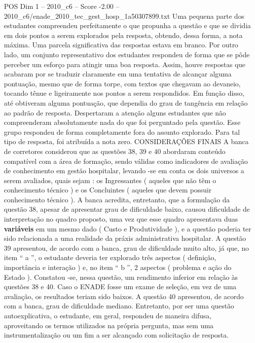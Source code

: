 \begin{textsample}{POS Dim 1 – 2010\_c6 – Score -2.00 – 2010\_c6/enade\_2010\_tec\_gest\_hosp\_1a50307899.txt}
Uma pequena parte dos estudantes compreendeu perfeitamente o que propunha a questão e que se dividia em dois pontos a serem explorados pela resposta, obtendo, dessa forma, a nota máxima.
Uma parcela significativa das respostas estava em branco.
Por outro lado, um conjunto representativo dos estudantes respondeu de forma que se pôde perceber um esforço para atingir uma boa resposta.
Assim, houve respostas que acabaram por se traduzir claramente em uma tentativa de alcançar alguma pontuação, mesmo que de forma torpe, com textos que chegavam ao devaneio, tocando tênue e ligeiramente nos pontos a serem respondidos.
Em função disso, até obtiveram alguma pontuação, que dependia do grau de tangência em relação ao padrão de resposta.
Despertaram a atenção alguns estudantes que não compreenderam absolutamente nada do que foi perguntado pela questão.
Esse grupo respondeu de forma completamente fora do assunto explorado.
Para tal tipo de resposta, foi atribuída a nota zero.
CONSIDERAÇÕES FINAIS A banca de corretores considerou que as questões 38, 39 e 40 abordaram conteúdo compatível com a área de formação, sendo válidas como indicadores de avaliação de conhecimento em gestão hospitalar, levando -se em conta os dois universos a serem avaliados, quais sejam : os Ingressantes ( aqueles que não têm o conhecimento técnico ) e os Concluintes ( aqueles que devem possuir conhecimento técnico ).
A banca acredita, entretanto, que a formulação da questão 38, apesar de apresentar grau de dificuldade baixo, causou dificuldade de interpretação no quadro proposto, uma vez que esse quadro apresentava duas \textbf{variáveis} em um mesmo dado ( Custo e Produtividade ), e a questão poderia ter sido relacionada a uma realidade da práxis administrativa hospitalar.
A questão 39 apresentou, de acordo com a banca, grau de dificuldade muito alto, já que, no item “ a ”, o estudante deveria ter explorado três aspectos ( definição, importância e interação ) e, no item “ b ”, 2 aspectos ( problema e ação do Estado ).
Constatou -se, nessa questão, um rendimento inferior em relação às questões 38 e 40.
Caso o ENADE fosse um exame de seleção, em vez de uma avaliação, os resultados teriam sido baixos.
A questão 40 apresentou, de acordo com a banca, grau de dificuldade mediano.
Entretanto, por ser uma questão autoexplicativa, o estudante, em geral, respondeu de maneira difusa, aproveitando os termos utilizados na própria pergunta, mas sem uma instrumentalização ou um fim a ser alcançado com solicitação de resposta.

\end{textsample}
